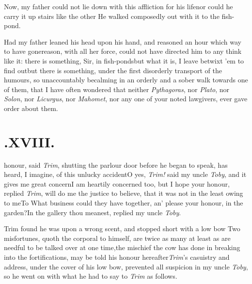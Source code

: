 \documentclass[twoside]{article}
\begin{document}
Now, my father could not lie down with this affliction for his
life\tsk nor could he carry it up stairs like the other\tsk
He walked composedly out with it to the fish-pond.

Had my father leaned his head upon his hand, and reasoned an
hour which way to have gone\tsk reason, with all her
force, could not have directed him to any think like it: there is
something, Sir, in fish-ponds\tsk but what it is, I leave\break
{} betwixt ’em to find
out\tsk but there is something, under the first disorderly\break
transport of the humours, so unaccountably becalming in an orderly
and a sober walk towards one of them, that I have often wondered
that neither \textit{Pythagoras}, nor \textit{Plato}, nor \textit{Solon},
nor \textit{Licurgus}, nor \textit{Mahomet}, nor any one of your noted
lawgivers, ever gave order about them.

\medskip
\section{.\enspace XVIII.}

 honour, said \textit{Trim}, shutting\break
the parlour door before he began\break
to speak, has heard, I imagine, of this
unlucky accident\tsk\tsk O yes,
\textit{Trim!} said my uncle \textit{Toby}, and it gives me
great\break
concern\tsk I am heartily concerned too, but I hope your honour,
replied \textit{Trim},\break
will do me the justice to believe, that it was
not in the least owing to me\tsh To
What business could they have together, an’ please your honour, in
the garden?\tsk\break In the gallery thou meanest, replied my
uncle \textit{Toby}.

Trim found he was upon a wrong\break
scent, and stopped short with a low bow\break
\tsh Two misfortunes, quoth the corporal to
himself, are twice as many at least as are needful to be talked
over at one time,\break\tsh the mischief the cow has done in
breaking into the fortifications, may be 
told his honour hereafter\tsk \textit{Trim}’s casuistry and address,
under the cover of his low bow, prevented all suspicion in my uncle
\textit{Toby}, so he went on with what he had to say to \textit{Trim}
as follows.
\end{document}
